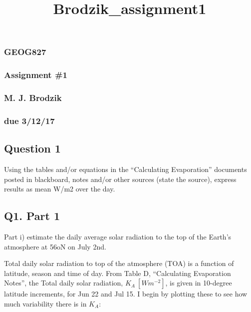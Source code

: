 \documentclass{article}
\title{Brodzik\_assignment1}
\begin{document}
    
    
    \maketitle
    
    

    
    \subsubsection{GEOG827}\label{geog827}

\subsubsection{Assignment \#1}\label{assignment-1}

\subsubsection{M. J. Brodzik}\label{m.-j.-brodzik}

\subsubsection{due 3/12/17}\label{due-31217}

\subsection{Question 1}\label{question-1}

Using the tables and/or equations in the ``Calculating Evaporation''
documents posted in blackboard, notes and/or other sources (state the
source), express results as mean W/m2 over the day.

\subsection{Q1. Part 1}\label{q1.-part-1}

Part i) estimate the daily average solar radiation to the top of the
Earth's atmosphere at 56oN on July 2nd.

Total daily solar radiation to top of the atmosphere (TOA) is a function
of latitude, season and time of day. From Table D, ``Calculating
Evaporation Notes'', the Total daily solar radiation,
\(K_A\ [W m^{-2}]\), is given in 10-degree latitude increments, for Jun
22 and Jul 15. I begin by plotting these to see how much variability
there is in \(K_A\):
\end{document}
